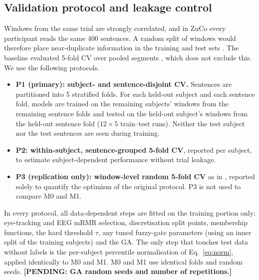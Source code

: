 \documentclass[11pt,a4paper]{article}
\newcommand{\pending}[1]{\textcolor{red!75!black}{\textbf{[PENDING: #1]}}}
\begin{document}
\subsection{Validation protocol and leakage control}
Windows from the same trial are strongly correlated, and in ZuCo every participant reads the same 400 sentences. A random split of windows would therefore place near-duplicate information in the training and test sets \cite{Li2021,Khan2025}. The baseline evaluated 5-fold CV over pooled segments \cite{FarhadiSedehi2024a}, which does not exclude this. We use the following protocols.
\begin{itemize}
  \item \textbf{P1 (primary): subject- and sentence-disjoint CV.} Sentences are partitioned into 5 stratified folds. For each held-out subject and each sentence fold, models are trained on the remaining subjects' windows from the remaining sentence folds and tested on the held-out subject's windows from the held-out sentence fold ($12\times5$ train--test runs). Neither the test subject nor the test sentences are seen during training.
  \item \textbf{P2: within-subject, sentence-grouped 5-fold CV}, reported per subject, to estimate subject-dependent performance without trial leakage.
  \item \textbf{P3 (replication only): window-level random 5-fold CV} as in \cite{FarhadiSedehi2024a}, reported solely to quantify the optimism of the original protocol. P3 is not used to compare M0 and M1.
\end{itemize}
In every protocol, all data-dependent steps are fitted on the training portion only: eye-tracking and EEG mRMR selection, discretisation split points, membership functions, the hard threshold $\tau$, any tuned fuzzy-gate parameters (using an inner split of the training subjects) and the GA. The only step that touches test data without labels is the per-subject percentile normalisation of Eq.~\eqref{eq:norm}, applied identically to M0 and M1. M0 and M1 use identical folds and random seeds. \pending{GA random seeds and number of repetitions.}
\end{document}
